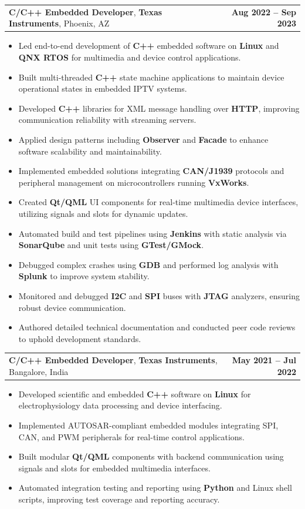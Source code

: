 \documentclass[letterpaper,11pt]{article}
\makeatletter
\newcommand{\resumeItem}[1]{
  \item\footnotesize{
    {#1 \vspace{-2pt}}
  }
}
\newcommand{\resumeSubheading}[4]{
  \vspace{-2pt}\item
    \begin{tabular*}{1.0\textwidth}[t]{l@{\extracolsep{\fill}}r}
      \textbf{\fontsize{10pt}{14pt}\selectfont #3}, \textbf{\fontsize{10pt}{14pt}\selectfont #1}, \fontsize{10pt}{14pt}\selectfont #4 & \textbf{\fontsize{10pt}{14pt}\selectfont #2} \\
    \end{tabular*}\vspace{-7pt}
}
\newcommand{\resumeItemListStart}{\begin{itemize}[leftmargin=*]}
\newcommand{\resumeItemListEnd}{\end{itemize}\vspace{-5pt}}
\makeatother
\begin{document}
    \resumeSubheading
        {Texas Instruments}{Aug 2022 -- Sep 2023}
        {C/C++ Embedded Developer}{Phoenix, AZ}
      \resumeItemListStart
        \resumeItem{Led end-to-end development of \textbf{C++} embedded software on \textbf{Linux} and \textbf{QNX RTOS} for multimedia and device control applications.}
        \resumeItem{Built multi-threaded \textbf{C++} state machine applications to maintain device operational states in embedded IPTV systems.}
        \resumeItem{Developed \textbf{C++} libraries for XML message handling over \textbf{HTTP}, improving communication reliability with streaming servers.}
        \resumeItem{Applied design patterns including \textbf{Observer} and \textbf{Facade} to enhance software scalability and maintainability.}
        \resumeItem{Implemented embedded solutions integrating \textbf{CAN/J1939} protocols and peripheral management on microcontrollers running \textbf{VxWorks}.}
        \resumeItem{Created \textbf{Qt/QML} UI components for real-time multimedia device interfaces, utilizing signals and slots for dynamic updates.}
        \resumeItem{Automated build and test pipelines using \textbf{Jenkins} with static analysis via \textbf{SonarQube} and unit tests using \textbf{GTest/GMock}.}
        \resumeItem{Debugged complex crashes using \textbf{GDB} and performed log analysis with \textbf{Splunk} to improve system stability.}
        \resumeItem{Monitored and debugged \textbf{I2C} and \textbf{SPI} buses with \textbf{JTAG} analyzers, ensuring robust device communication.}
        \resumeItem{Authored detailed technical documentation and conducted peer code reviews to uphold development standards.}
      \resumeItemListEnd

    \resumeSubheading
        {Texas Instruments}{May 2021 -- Jul 2022}
        {C/C++ Embedded Developer}{Bangalore, India}
      \resumeItemListStart
        \resumeItem{Developed scientific and embedded \textbf{C++} software on \textbf{Linux} for electrophysiology data processing and device interfacing.}
        \resumeItem{Implemented AUTOSAR-compliant embedded modules integrating SPI, CAN, and PWM peripherals for real-time control applications.}
        \resumeItem{Built modular \textbf{Qt/QML} components with backend communication using signals and slots for embedded multimedia interfaces.}
        \resumeItem{Automated integration testing and reporting using \textbf{Python} and Linux shell scripts, improving test coverage and reporting accuracy.}
      \resumeItemListEnd
\end{document}

